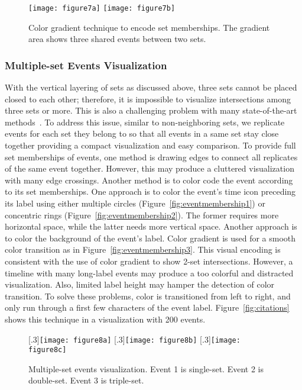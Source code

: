 \begin{figure}[ht]
	\centering
		{\texttt{[image: figure7a]}}\label{fig:gradient1}
	\hfill
		{\texttt{[image: figure7b]}}\label{fig:gradient2}
	\caption{Color gradient technique to encode set memberships. The gradient area shows three shared events between two sets.}
	\label{fig:gradient}
\end{figure}

\subsubsection{Multiple-set Events Visualization}
With the vertical layering of sets as discussed above, three sets cannot be placed closed to each other; therefore, it is impossible to visualize intersections among three sets or more. This is also a challenging problem with many state-of-the-art methods~\cite{Alsallakh2014}. To address this issue, similar to non-neighboring sets, we replicate events for each set they belong to so that all events in a same set stay close together providing a compact visualization and easy comparison. To provide full set memberships of events, one method is drawing edges to connect all replicates of the same event together. However, this may produce a cluttered visualization with many edge crossings. Another method is to color code the event according to its set memberships. One approach is to color the event's time icon preceding its label using either multiple circles (Figure~\ref{fig:eventmembership1}) or concentric rings (Figure~\ref{fig:eventmembership2}). The former requires more horizontal space, while the latter needs more vertical space. Another approach is to color the background of the event's label. Color gradient is used for a smooth color transition as in Figure~\ref{fig:eventmembership3}. This visual encoding is consistent with the use of color gradient to show 2-set intersections. However, a timeline with many long-label events may produce a too colorful and distracted visualization. Also, limited label height may hamper the detection of color transition. To solve these problems, color is transitioned from left to right, and only run through a first few characters of the event label. Figure~\ref{fig:citations} shows this technique in a visualization with 200 events.

\begin{figure}[ht]
	\centering
	[.3\columnwidth]{\label{fig:eventmembership1}\texttt{[image: figure8a]}}
	\hfill
	[.3\columnwidth]{\label{fig:eventmembership2}\texttt{[image: figure8b]}}
	\hfill
	[.3\columnwidth]{\label{fig:eventmembership3}\texttt{[image: figure8c]}}
	\caption{Multiple-set events visualization. Event 1 is single-set. Event 2 is double-set. Event 3 is triple-set.}
	\label{fig:eventmembership}
\end{figure}

